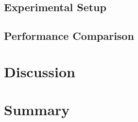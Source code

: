 \documentclass[
  twoColumns,
  fontsize=10pt,
  baseClass=extarticle
]{formularyETH/formularyETH}
\begin{document}
\subsection{Experimental Setup}\label{subsec:experimental_setup}

\subsection{Performance Comparison}\label{subsec:performance_comparison}


\section{Discussion}\label{sec:discussion}


\section{Summary}\label{sec:summary}


\setlength{\columnsep}{1mm}
% 
% 
  

 
  
\end{document}
